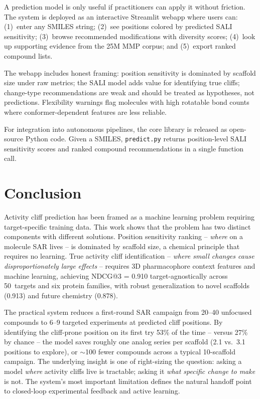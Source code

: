 \documentclass[sigconf, nonacm]{acmart}
\begin{document}
A prediction model is only useful if practitioners can apply it without friction. The system is deployed as an interactive Streamlit webapp where users can: (1)~enter any SMILES string; (2)~see positions colored by predicted SALI sensitivity; (3)~browse recommended modifications with diversity scores; (4)~look up supporting evidence from the 25M MMP corpus; and (5)~export ranked compound lists.

The webapp includes honest framing: position sensitivity is dominated by scaffold size under raw metrics; the SALI model adds value for identifying true cliffs; change-type recommendations are weak and should be treated as hypotheses, not predictions. Flexibility warnings flag molecules with high rotatable bond counts where conformer-dependent features are less reliable.

For integration into autonomous pipelines, the core library is released as open-source Python code. Given a SMILES, \texttt{predict.py} returns position-level SALI sensitivity scores and ranked compound recommendations in a single function call.

\section{Conclusion}

Activity cliff prediction has been framed as a machine learning problem requiring target-specific training data. This work shows that the problem has two distinct components with different solutions. Position sensitivity ranking -- \textit{where} on a molecule SAR lives -- is dominated by scaffold size, a chemical principle that requires no learning. True activity cliff identification -- \textit{where small changes cause disproportionately large effects} -- requires 3D pharmacophore context features and machine learning, achieving NDCG@3 = 0.910 target-agnostically across 50~targets and six protein families, with robust generalization to novel scaffolds (0.913) and future chemistry (0.878).

The practical system reduces a first-round SAR campaign from 20--40 unfocused compounds to 6--9 targeted experiments at predicted cliff positions. By identifying the cliff-prone position on its first try 53\% of the time -- versus 27\% by chance -- the model saves roughly one analog series per scaffold (2.1 vs.\ 3.1 positions to explore), or ${\sim}$100 fewer compounds across a typical 10-scaffold campaign. The underlying insight is one of right-sizing the question: asking a model \textit{where} activity cliffs live is tractable; asking it \textit{what specific change to make} is not. The system's most important limitation defines the natural handoff point to closed-loop experimental feedback and active learning.
\end{document}
